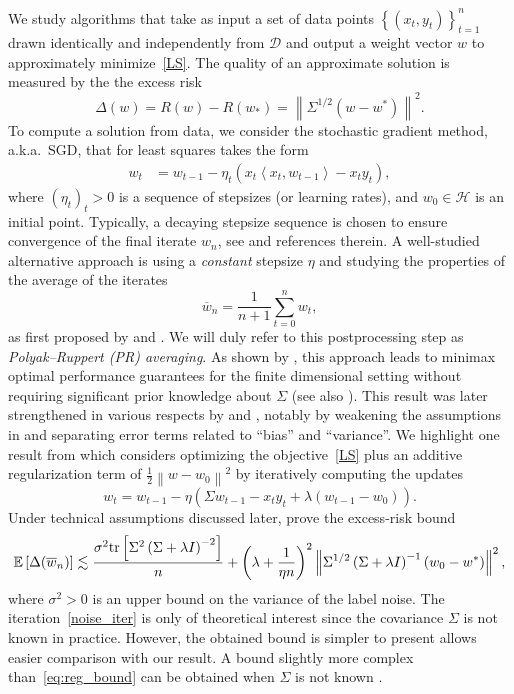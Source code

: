 \documentclass[final,12pt]{colt2018} %
\newcommand{\HH}{\mathcal{H}}
\newcommand{\DD}{\mathcal{D}}
\newcommand{\trace}[1]{\mbox{\normalfont tr}\left[#1\right]}
\newcommand{\EE}[1]{\mathbb{E}\left[#1\right]}
\newcommand{\norm}[1]{\left\|#1\right\|}
\newcommand{\ev}[1]{\left\{#1\right\}}
\newcommand{\pa}[1]{\left(#1\right)}
\newcommand{\bw}{\overline{w}}
\newcommand{\iprod}[2]{\left\langle#1, #2\right\rangle}
\begin{document}
We study algorithms that take as  input a set of data points $\ev{(x_t,y_t)}_{t=1}^n$ drawn identically and independently from $\DD$ and 
output a weight vector $w$  to approximately  minimize~\eqref{LS}. The quality of an approximate solution is measured by the 
the excess risk
\[
 \Delta(w) = R(w) - R(w_*) = \norm{\Sigma^{1/2} \pa{w - w^*}}^2.
\]
To compute a solution from data,  we consider the stochastic gradient method, a.k.a.~SGD, that for least squares takes the form
\begin{align}\label{eq:SGD}
 w_{t} &= w_{t-1} - \eta_t \pa{x_{t} \iprod{x_{t}}{w_{t-1}} - x_{t} y_{t}},
\end{align}
where $(\eta_t)_t>0$ is a sequence of stepsizes (or learning rates), and $w_0 \in \HH$ is an  initial point.
Typically, a decaying stepsize sequence is chosen to ensure convergence of the final iterate $w_n$, see  \cite{NJLS09} and references 
therein. A well-studied alternative approach is using a \emph{constant} stepsize $\eta$ and studying the properties of the 
average of the iterates 
\[
 \bw_n = \frac{1}{n+1} \sum_{t=0}^n w_t,
\]
as first proposed by \citet{P91} and \citet{R88}. We will duly refer to this postprocessing step as \emph{Polyak--Ruppert (PR) averaging}. 
As shown by \citet{BM13}, this approach leads to minimax optimal performance guarantees for the finite dimensional setting without 
requiring significant prior knowledge about $\Sigma$ (see also \citealp{GyW96}). 
This result was later strengthened in 
various respects by \citet{DB15} and \citet*{DFB16},  notably by weakening the assumptions in \citet{BM13} and separating error terms  
related to ``bias'' and ``variance''.  We highlight one result from  \citet{DFB16} which considers optimizing the objective~\eqref{LS} plus 
an additive regularization term of $\frac 12 \norm{w - w_0}^2$ by iteratively computing the updates
\begin{equation}\label{noise_iter}
w_{t} = w_{t-1} - \eta \pa{\Sigma w_{t-1} - x_{t} y_{t} +\lambda \pa{w_{t-1} - w_0}}.
\end{equation}
Under  technical assumptions discussed later,  \citet{DFB16} prove the excess-risk bound 
\begin{equation}\label{eq:reg_bound}
 \EE{\Delta(\bw_n)} \lesssim \frac{\sigma^2 \trace{\Sigma^2 \pa{\Sigma+\lambda I}^{-2}}}{n} + \pa{\lambda + \frac{1}{\eta n}}^2 
\norm{\Sigma^{1/2} \pa{\Sigma + \lambda I}^{-1}\pa{w_0 - w^*}}^2,
\end{equation}
where $\sigma^2 > 0$ is an upper bound on the variance of the label noise.
The iteration~\eqref{noise_iter} is only of theoretical interest since the covariance $\Sigma$ is not known in practice. However, the 
obtained bound is simpler to present allows easier comparison with our result. A bound slightly more complex   than~\eqref{eq:reg_bound} 
can be obtained when $\Sigma$ is not known  \citep[Theorem~2]{DFB16}.
\end{document}
